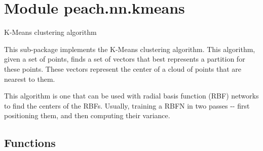 %
%
%


\section{Module peach.nn.kmeans}

    \label{peach:nn:kmeans}

K-Means clustering algorithm

This sub-package implements the K-Means clustering algorithm. This algorithm,
given a set of points, finds a set of vectors that best represents a partition
for these points. These vectors represent the center of a cloud of points that
are nearest to them.

This algorithm is one that can be used with radial basis function (RBF) networks
to find the centers of the RBFs. Usually, training a RBFN in two passes -{}- first
positioning them, and then computing their variance.


  \subsection{Functions}

    \label{peach:nn:kmeans:ClassByDistance}

    \vspace{0.5ex}

